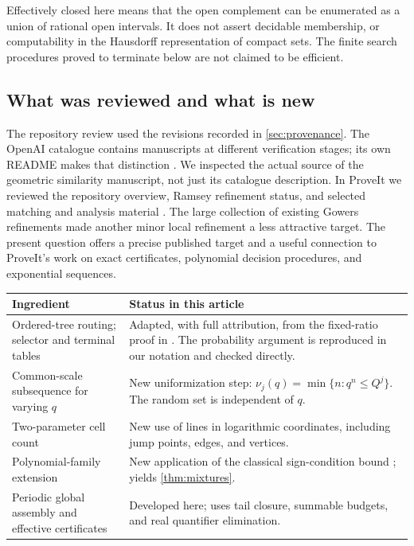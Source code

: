Effectively closed here means that the open complement can be enumerated
as a union of rational open intervals. It does not assert decidable
membership, or computability in the Hausdorff representation of compact
sets. The finite search procedures proved to terminate below are not
claimed to be efficient.

\subsection{What was reviewed and what is new}

The repository review used the revisions recorded in \cref{sec:provenance}.
The OpenAI catalogue contains manuscripts at different verification stages;
its own README makes that distinction \cite{OpenAICatalog}. We inspected
the actual source of the geometric similarity manuscript, not just its
catalogue description. In ProveIt we reviewed the repository overview,
Ramsey refinement status, and selected matching and analysis material
\cite{ProveIt}. The large collection of existing Gowers refinements made
another minor local refinement a less attractive target. The present
question offers a precise published target and a useful connection to
ProveIt's work on exact certificates, polynomial decision procedures, and
exponential sequences.

\begin{center}
\begin{tabular}{@{}>{\raggedright\arraybackslash}p{}>{\raggedright\arraybackslash}p{}@{}}
\toprule
Ingredient & Status in this article\\
\midrule
Ordered-tree routing; selector and terminal tables & Adapted, with full
attribution, from the fixed-ratio proof in \cite{OpenAI84}. The probability
argument is reproduced in our notation and checked directly.\\[3pt]
Common-scale subsequence for varying $q$ & New uniformization step:
$\nu_j(q)=\min\{n:q^n\le Q^j\}$. The random set is independent of $q$.\\[3pt]
Two-parameter cell count & New use of lines in logarithmic coordinates,
including jump points, edges, and vertices.\\[3pt]
Polynomial-family extension & New application of the classical
sign-condition bound \cite{BPR}; yields \cref{thm:mixtures}.\\[3pt]
Periodic global assembly and effective certificates & Developed here;
uses tail closure, summable budgets, and real quantifier elimination.\\
\bottomrule
\end{tabular}
\end{center}

